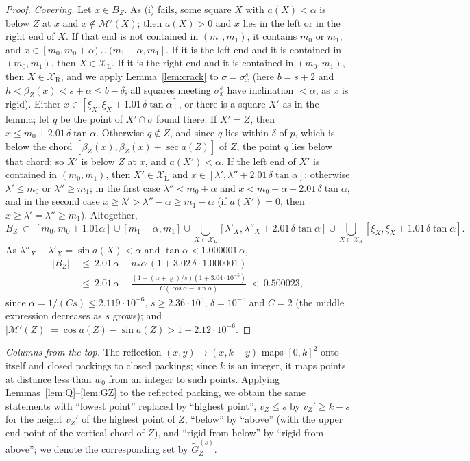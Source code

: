 \documentclass[11pt]{amsart}
\theoremstyle{definition}
\theoremstyle{remark}
\begin{document}
\begin{proof}
\emph{Covering.} Let $x\in B_Z$. As (i) fails, some square $X$ with $a(X)<\alpha$ is below $Z$ at $x$ and $x\notin\mathcal M'(X)$; then
$a(X)>0$ and $x$ lies in the left or in the right end of $X$. If that end is not contained in $(m_0,m_1)$, it contains $m_0$ or
$m_1$, and $x\in[m_0,m_0+\alpha)\cup(m_1-\alpha,m_1]$. If it is the left end and it is contained in $(m_0,m_1)$, then $X\in\mathcal X_{\mathrm L}$.
If it is the right end and it is contained in $(m_0,m_1)$, then $X\in\mathcal X_{\mathrm R}$, and we apply Lemma~\ref{lem:crack} to
$\sigma=\sigma^s_x$ (here $b=s+2$ and $h<\beta_Z(x)<s+\alpha\le b-\delta$; all squares meeting $\sigma^s_x$ have inclination $<\alpha$, as $x$ is
rigid). Either $x\in[\xi_X,\xi_X+1.01\,\delta\tan\alpha]$, or there is a square $X'$ as in the lemma; let $q$ be the point of $X'\cap\sigma$
found there. If $X'=Z$, then $x\le m_0+2.01\,\delta\tan\alpha$. Otherwise $q\notin Z$, and since $q$ lies within $\delta$ of $p$, which is below
the chord $[\beta_Z(x),\beta_Z(x)+\sec a(Z)]$ of $Z$, the point $q$ lies below that chord; so $X'$ is below $Z$ at $x$, and
$a(X')<\alpha$. If the left end of $X'$ is contained in $(m_0,m_1)$, then $X'\in\mathcal X_{\mathrm L}$ and $x\in[\lambda',\lambda''+2.01\,\delta\tan\alpha]$;
otherwise $\lambda'\le m_0$ or $\lambda''\ge m_1$; in the first case $\lambda''<m_0+\alpha$ and $x<m_0+\alpha+2.01\,\delta\tan\alpha$, and in
the second case $x\ge\lambda'>\lambda''-\alpha\ge m_1-\alpha$ (if $a(X')=0$, then $x\ge\lambda'=\lambda''\ge m_1$). Altogether,
\[
B_Z\ \subset\ [m_0,m_0+1.01\alpha]\cup[m_1-\alpha,m_1]\cup\bigcup_{X\in\mathcal X_{\mathrm L}}[\lambda'_X,\lambda''_X+2.01\,\delta\tan\alpha]\cup
\bigcup_{X\in\mathcal X_{\mathrm R}}[\xi_X,\xi_X+1.01\,\delta\tan\alpha].
\]
As $\lambda''_X-\lambda'_X=\sin a(X)<\alpha$ and $\tan\alpha<1.000001\,\alpha$,
\begin{align*}
|B_Z|\ &\le\ 2.01\,\alpha+n_*\alpha\,(1+3.02\,\delta\cdot1.000001)\\
&\le\ 2.01\,\alpha+\frac{(1+(\alpha+\varrho)/s)(1+3.04\cdot10^{-5})}{C(\cos\alpha-\sin\alpha)}\ <\ 0.500023,
\end{align*}
since $\alpha=1/(Cs)\le2.119\cdot10^{-6}$, $s\ge2.36\cdot10^5$, $\delta=10^{-5}$ and $C=2$ (the middle expression decreases as $s$ grows); and
$|\mathcal M'(Z)|=\cos a(Z)-\sin a(Z)>1-2.12\cdot10^{-6}$.
\end{proof}

\noindent\emph{Columns from the top.} The reflection $(x,y)\mapsto(x,k-y)$ maps $[0,k]^2$ onto itself and closed packings to closed
packings; since $k$ is an integer, it maps points at distance less than $w_0$ from an integer to such points. Applying
Lemmas~\ref{lem:Q}--\ref{lem:GZ} to the reflected packing, we obtain the same statements with ``lowest point'' replaced by
``highest point'', $v_Z\le s$ by $v_Z'\ge k-s$ for the height $v_Z'$ of the highest point of $Z$, ``below'' by ``above'' (with the upper end
point of the vertical chord of $Z$), and ``rigid from below'' by ``rigid from above''; we denote the corresponding set by
$\widetilde G_Z^{(s)}$.
\end{document}
